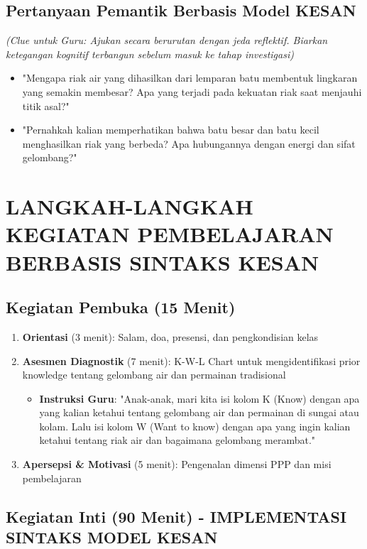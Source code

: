 \documentclass[12pt,a4paper]{article}
\begin{document}
\subsection{Pertanyaan Pemantik Berbasis Model KESAN}
\textit{(Clue untuk Guru: Ajukan secara berurutan dengan jeda reflektif. Biarkan ketegangan kognitif terbangun sebelum masuk ke tahap investigasi)}

\begin{itemize}
\item "Mengapa riak air yang dihasilkan dari lemparan batu membentuk lingkaran yang semakin membesar? Apa yang terjadi pada kekuatan riak saat menjauhi titik asal?"
\item "Pernahkah kalian memperhatikan bahwa batu besar dan batu kecil menghasilkan riak yang berbeda? Apa hubungannya dengan energi dan sifat gelombang?"
\end{itemize}

\section{LANGKAH-LANGKAH KEGIATAN PEMBELAJARAN BERBASIS SINTAKS KESAN}

\subsection{Kegiatan Pembuka (15 Menit)}

\begin{enumerate}
\item \textbf{Orientasi} (3 menit): Salam, doa, presensi, dan pengkondisian kelas
\item \textbf{Asesmen Diagnostik} (7 menit): K-W-L Chart untuk mengidentifikasi prior knowledge tentang gelombang air dan permainan tradisional
   \begin{itemize}
   \item \textbf{Instruksi Guru}: "Anak-anak, mari kita isi kolom K (Know) dengan apa yang kalian ketahui tentang gelombang air dan permainan di sungai atau kolam. Lalu isi kolom W (Want to know) dengan apa yang ingin kalian ketahui tentang riak air dan bagaimana gelombang merambat."
   \end{itemize}
\item \textbf{Apersepsi \& Motivasi} (5 menit): Pengenalan dimensi PPP dan misi pembelajaran
\end{enumerate}

\subsection{Kegiatan Inti (90 Menit) - IMPLEMENTASI SINTAKS MODEL KESAN}
\end{document}
